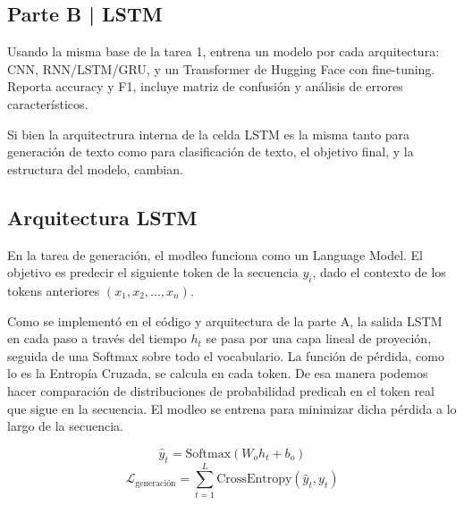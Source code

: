 \newpage

\begin{myblock}
\section*{Parte B | LSTM}

    Usando la misma base de la tarea 1, entrena un modelo por cada arquitectura: 
    CNN, RNN/LSTM/GRU, y un Transformer de Hugging Face con fine-tuning. Reporta
    accuracy y F1, incluye matriz de confusión y análisis de errores característicos.  

\end{myblock}



Si bien la arquitectrura interna de la celda LSTM es la misma tanto para 
generación de texto como para clasificación de texto, el objetivo final, y la
estructura del modelo, cambian. 


\subsection{Arquitectura LSTM}

En la tarea de generación, el modleo funciona como un Language Model. El objetivo
es predecir el siguiente token de la secuencia $y_i$, dado el contexto de los
tokens anteriores $(x_1, x_2,...,x_n)$. 

Como se implementó en el código y arquitectura de la parte A, la salida LSTM en 
cada paso a través del tiempo $h_t$ se pasa por una capa lineal de proyeción, seguida
de una Softmax sobre todo el vocabulario. La función de pérdida, como lo 
es la Entropía Cruzada, se calcula en cada token. De esa manera podemos hacer 
comparación de distribuciones de probabilidad predicah en el token real que
sigue en la secuencia. El modleo se entrena para minimizar dicha pérdida a lo 
largo de la secuencia.

\[
    \hat{y}_t = \mathrm{Softmax}(W_o h_t + b_o)
\]
\[
    \mathcal{L}_{\text{generación}} = \sum_{t=1}^{L} \mathrm{CrossEntropy}(\hat{y}_t, y_t)
\]


